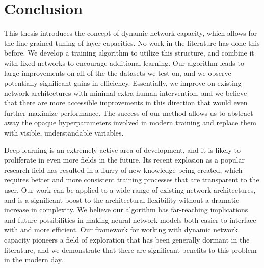 \chapter{Conclusion}
This thesis introduces the concept of dynamic network capacity, which allows for the fine-grained tuning of layer capacities.
No work in the literature has done this before.
We develop a training algorithm to utilize this structure, and combine it with fixed networks to encourage additional learning.
Our algorithm leads to large improvements on all of the the datasets we test on, and we observe potentially significant gains in efficiency.
Essentially, we improve on existing network architectures with minimal extra human intervention, and we believe that there are more accessible improvements in this direction that would even further maximize performance.
The success of our method allows us to abstract away the opaque hyperparameters involved in modern training and replace them with visible, understandable variables.

Deep learning is an extremely active area of development, and it is likely to proliferate in even more fields in the future.
Its recent explosion as a popular research field has resulted in a flurry of new knowledge being created, which requires better and more consistent training processes that are transparent to the user.
Our work can be applied to a wide range of existing network architectures, and is a significant boost to the architectural flexibility without a dramatic increase in complexity.
We believe our algorithm has far-reaching implications and future possibilities in making neural network models both easier to interface with and more efficient.
Our framework for working with dynamic network capacity pioneers a field of exploration that has been generally dormant in the literature, and we demonstrate that there are significant benefits to this problem in the modern day.
